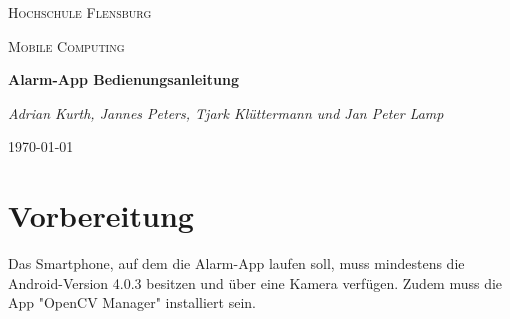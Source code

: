 \documentclass[11pt]{article}
\begin{document}
	\begin{titlepage}
		\centering
		{\scshape\LARGE Hochschule Flensburg\par}
		\vspace{1cm}
		{\scshape\Large Mobile Computing\par}
		\vspace{1.5cm}
		{\huge\bfseries Alarm-App Bedienungsanleitung\par}
		\vspace{2cm}
		{\Large\itshape Adrian Kurth, Jannes Peters, Tjark Kl{\"u}ttermann und Jan Peter Lamp\par}
		
		
		\vfill
		
		{\large \today\par}
	\end{titlepage}
\section{Vorbereitung}
Das Smartphone, auf dem die Alarm-App laufen soll, muss mindestens die Android-Version 4.0.3 besitzen und {\"u}ber eine Kamera verf{\"u}gen. Zudem muss die App "OpenCV Manager" installiert sein.
\end{document}
